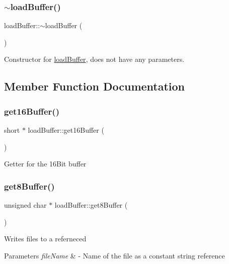 \subsubsection{\texorpdfstring{$\sim$load\+Buffer()}{~loadBuffer()}}
{\footnotesize\ttfamily load\+Buffer\+::$\sim$load\+Buffer (\begin{DoxyParamCaption}{ }\end{DoxyParamCaption})\hspace{0.3cm}{\ttfamily [virtual]}}

Constructor for \hyperlink{classloadBuffer}{load\+Buffer}, does not have any parameters. 

\subsection{Member Function Documentation}
\mbox{\label{classloadBuffer_aa6b14cb999de76cfce307f7036310859}} 
\subsubsection{\texorpdfstring{get16\+Buffer()}{get16Buffer()}}
{\footnotesize\ttfamily short $\ast$ load\+Buffer\+::get16\+Buffer (\begin{DoxyParamCaption}{ }\end{DoxyParamCaption})}

Getter for the 16\+Bit buffer \mbox{\label{classloadBuffer_ace04b355c2b23c72abd1d322dcb960ee}} 
\subsubsection{\texorpdfstring{get8\+Buffer()}{get8Buffer()}}
{\footnotesize\ttfamily unsigned char $\ast$ load\+Buffer\+::get8\+Buffer (\begin{DoxyParamCaption}{ }\end{DoxyParamCaption})}

Writes files to a referneced 
\begin{DoxyParams}{Parameters}
{\em file\+Name} & -\/ Name of the file as a constant string reference \\
\hline
\end{DoxyParams}
\mbox{\label{classloadBuffer_aa4d8b0a75f4459dc0f255f62d822e14b}} 
